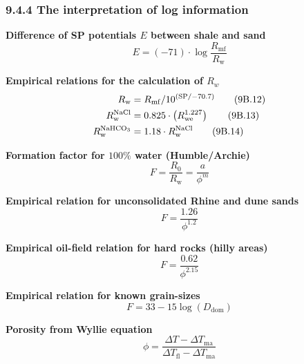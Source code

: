 \subsubsection{9.4.4 The interpretation of log information}
\textbf{Difference of SP potentials $E$ between shale and sand}
\begin{equation*}
    E = (-71)\cdot\log\frac{R_\mathrm{mf}}{R_\mathrm{w}}\tag{9B.11}
\end{equation*}

\textbf{Empirical relations for the calculation of $R_w$}
\begin{align}
    R_\mathrm{w}               & = R_\mathrm{mf} / 10^{(\mathrm{SP} / -70.7)}\tag{9B.12}     \\
    R_\mathrm{w}^{\ce{NaCl}}   & = 0.825\cdot\left( R_\mathrm{we}^{1.227} \right)\tag{9B.13} \\
    R_\mathrm{w}^{\ce{NaHCO3}} & = 1.18\cdot R_\mathrm{w}^{\ce{NaCl}}\tag{9B.14}
\end{align}

\textbf{Formation factor for $100\%$ water (Humble/Archie)}
\begin{equation*}
    F = \frac{R_0}{R_\mathrm{w}} = \frac{a}{\phi^m}\tag{9B.15}
\end{equation*}

\textbf{Empirical relation for unconsolidated Rhine and dune sands}
\begin{equation*}
    F = \frac{1.26}{\phi^{1.2}}\tag{9B.16}
\end{equation*}

\textbf{Empirical oil-field relation for hard rocks (hilly areas)}
\begin{equation*}
    F = \frac{0.62}{\phi^{2.15}}\tag{9B.17}
\end{equation*}

\textbf{Empirical relation for known grain-sizes}
\begin{equation*}
    F = 33 - 15\log(D_\mathrm{dom})\tag{9B.18}
\end{equation*}

\textbf{Porosity from Wyllie equation}
\begin{equation*}
    \phi = \frac{\Delta T - \Delta T_\mathrm{ma}}{\Delta T_\mathrm{fl} - \Delta T_\mathrm{ma}}\tag{9B.19}
\end{equation*}